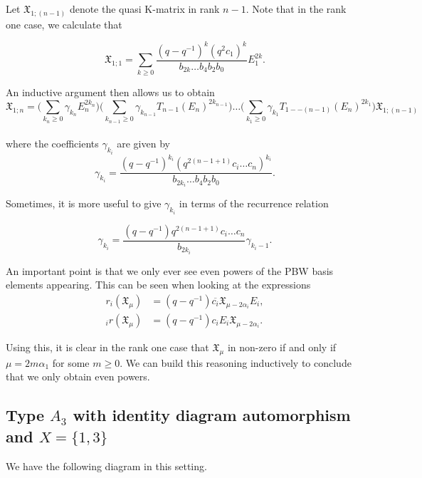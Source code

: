 \documentclass[a4 paper, 10pt]{article}
\theoremstyle{definition}
\theoremstyle{remark}
\numberwithin{equation}{section}
\begin{document}
Let $\mathfrak{X}_{1;(n-1)}$ denote the quasi K-matrix in rank $n-1$. Note that in the rank one case, we calculate that

\begin{equation}
	\mathfrak{X}_{1;1} = \sum_{k \geq 0} \dfrac{(q-q^{-1})^{k}(q^{2}c_1)^{k}}{b_{2k} \dots b_4b_2b_0} E_1^{2k}.
\end{equation}


An inductive argument then allows us to obtain
\begin{equation}
	\mathfrak{X}_{1;n} = \Big( \sum_{k_n \geq 0} \gamma_{k_n} E_n^{2k_n} \Big) \Big( \sum_{k_{n-1}\geq 0} \gamma_{k_{n-1}} T_{n-1}(E_n)^{2k_{n-1}} \Big) \dots \Big( \sum_{k_1 \geq 0} \gamma_{k_1} T_{1--(n-1)}(E_n)^{2k_1} \Big)\mathfrak{X}_{1;(n-1)}
\end{equation}
\\
where the coefficients $\gamma_{k_i}$ are given by 
\begin{equation}
	\gamma_{k_i} = \dfrac{(q-q^{-1})^{k_i}(q^{2(n-1+1)}c_i \dots c_n)^{k_i}}{b_{2k_i} \dots b_4b_2b_0}.
\end{equation}

Sometimes, it is more useful to give $\gamma_{k_i}$ in terms of the recurrence relation

\begin{equation}
	\gamma_{k_i} = \dfrac{(q-q^{-1})q^{2(n-1+1)}c_i \dots c_n}{b_{2k_i}}\gamma_{k_i-1}.
\end{equation}

An important point is that we only ever see even powers of the PBW basis elements appearing. This can be seen when looking at the expressions
\begin{align*}
	r_i(\mathfrak{X}_{\mu}) &= (q-q^{-1})\overline{c_i}\mathfrak{X}_{\mu - 2\alpha_i}E_i,\\
	_{i}r(\mathfrak{X}_{\mu}) &= (q-q^{-1})c_iE_i\mathfrak{X}_{\mu - 2\alpha_i}.
\end{align*}

Using this, it is clear in the rank one case that $\mathfrak{X}_{\mu}$ in non-zero if and only if $\mu = 2m\alpha_1$ for some $m \geq 0$.
We can build this reasoning inductively to conclude that we only obtain even powers.

\subsection{Type $A_3$ with identity diagram automorphism and $X = \{1,3\}$}
	We have the following diagram in this setting.
	
\end{document}
